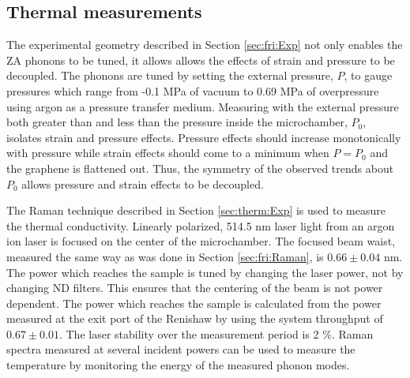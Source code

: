 \subsection{Thermal measurements}
The experimental geometry described in Section \ref{sec:fri:Exp} not only enables the ZA phonons to be tuned, it allows allows the effects of strain and pressure to be decoupled.
The phonons are tuned by setting the external pressure, $P$, to gauge pressures which range from -0.1 MPa of vacuum to 0.69 MPa of overpressure using argon as a pressure transfer medium.
Measuring with the external pressure both greater than and less than the pressure inside the microchamber, $P_0$, isolates strain and pressure effects.
Pressure effects should increase monotonically with pressure while strain effects should come to a minimum when $P=P_0$ and the graphene is flattened out.
Thus, the symmetry of the observed trends about $P_0$ allows pressure and strain effects to be decoupled.

The Raman technique described in Section \ref{sec:therm:Exp} is used to measure the thermal conductivity.
Linearly polarized, 514.5 nm laser light from an argon ion laser is focused on the center of the microchamber.
The focused beam waist, measured the same way as was done in Section \ref{sec:fri:Raman}, is $0.66 \pm 0.04$ nm.
The power which reaches the sample is tuned by changing the laser power, not by changing ND filters.
This ensures that the centering of the beam is not power dependent.
The power which reaches the sample is calculated from the power measured at the exit port of the Renishaw by using the system throughput of $0.67 \pm 0.01$.
The laser stability over the measurement period is 2 \%.
Raman spectra measured at several incident powers can be used to measure the temperature by monitoring the energy of the measured phonon modes.


